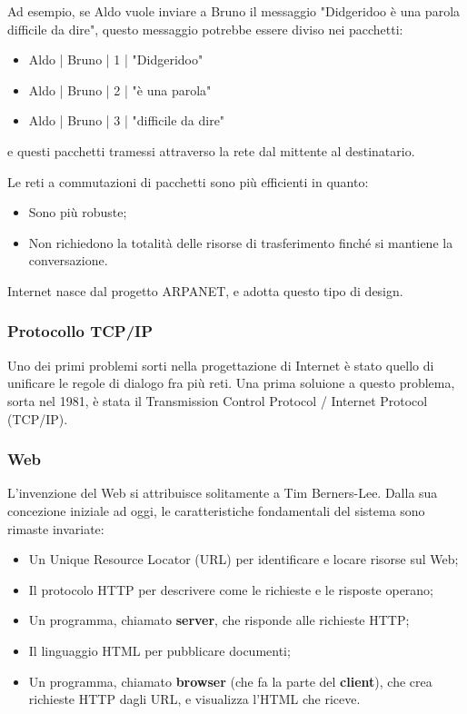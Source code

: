 \documentclass[a4paper,11pt]{article}
\begin{document}
Ad esempio, se Aldo vuole inviare a Bruno il messaggio "Didgeridoo è una parola difficile da dire", questo messaggio potrebbe essere diviso nei pacchetti:
\begin{itemize}
	\item Aldo | Bruno | 1 | "Didgeridoo"
	\item Aldo | Bruno | 2 | "è una parola"
	\item Aldo | Bruno | 3 | "difficile da dire"
\end{itemize}
e questi pacchetti tramessi attraverso la rete dal mittente al destinatario.

Le reti a commutazioni di pacchetti sono più efficienti in quanto:
\begin{itemize}
	\item Sono più robuste;
	\item Non richiedono la totalità delle risorse di trasferimento finché si mantiene la conversazione.
\end{itemize}
Internet nasce dal progetto ARPANET, e adotta questo tipo di design.

\subsubsection{Protocollo TCP/IP}
Uno dei primi problemi sorti nella progettazione di Internet è stato quello di unificare le regole di dialogo fra più reti.
Una prima soluione a questo problema, sorta nel 1981, è stata il Transmission Control Protocol / Internet Protocol (TCP/IP).

\subsubsection{Web}
L'invenzione del Web si attribuisce solitamente a Tim Berners-Lee.
Dalla sua concezione iniziale ad oggi, le caratteristiche fondamentali del sistema sono rimaste invariate:
\begin{itemize}
	\item Un Unique Resource Locator (URL) per identificare e locare risorse sul Web;
	\item Il protocolo HTTP per descrivere come le richieste e le risposte operano;
	\item Un programma, chiamato \textbf{server}, che risponde alle richieste HTTP;
	\item Il linguaggio HTML per pubblicare documenti;
	\item Un programma, chiamato \textbf{browser} (che fa la parte del \textbf{client}), che crea richieste HTTP dagli URL, e visualizza l'HTML che riceve.
\end{itemize}
\end{document}
